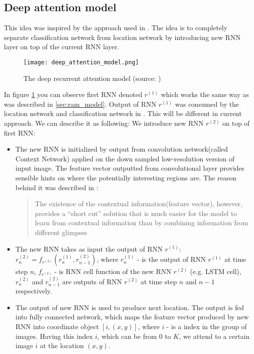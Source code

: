 \subsection{Deep attention model}
\label{subs:deep_att_model}
This idea was inspired by the approach used in \cite{DBLP:journals/corr/BaMK14}.
The idea is to completely separate classification network from location network
by introducing new RNN layer on top of the current RNN layer.

\begin{figure}
	\texttt{[image: deep\_attention\_model.png]}
	\caption{The deep recurrent attention model (source: \cite{DBLP:journals/corr/BaMK14})}
	\label{fig:deep_att_model}
\end{figure}

In figure \ref{fig:deep_att_model} you can observe first RNN denoted $r^{(1)}$ which works
the same way as was described in \autoref{sec:ram_model}. Output of RNN $r^{(1)}$
was consumed by the location network and classification network in \cite{DBLP:journals/corr/MnihHGK14}.
This will be different in current approach. We can describe it as following:
We introduce new RNN $r^{(2)}$ on top of first RNN:
\begin{itemize}
	\item The new \gls{RNN} is initialized by output from convolution
		network(called Context Network) applied on the down
		sampled low-resolution version of input image.
		The feature vector outputted from convolutional layer
		provides sensible hints on where
		the potentially interesting regions are.
		The reason behind it was described in \cite{DBLP:journals/corr/BaMK14}:
		\blockquote{The existence of the contextual information(feature vector),
		however, provides a
		“short cut” solution that is much easier for the model to
		learn from contextual information than by combining information
		from different glimpses}
	\item The new \gls{RNN} takes as input the output of \gls{RNN} $r^{(1)}$:
		$r_n^{(2)} = f_{r^{(2)}}(r_n^{(1)}, r_{n-1}^{(2)})$,
		where $r_n^{(1)}$ - is the output of \gls{RNN} $r^{(1)}$ at time step $n$,
		$f_{r^{(2)}}$ - is \gls{RNN} cell function of the new \gls{RNN} $r^{(2)}$ (e.g. \gls{LSTM} cell),
		  $r_n^{(2)}$ and $r_{n-1}^{(2)}$ are outputs of \gls{RNN} $r^{(2)}$
		  at time step $n$ and $n-1$ respectively.
	\item The output of new \gls{RNN} is used to produce next location.
		The output is fed into fully connected network, which maps
		the feature vector produced by new \gls{RNN} into coordinate object $[i, (x,y)]$,
		where $i$ - is a index in the group of images. Having this index $i$,
		which can be from $0$ to $K$, we attend to a certain image $i$ at the location $(x, y)$.
\end{itemize}

